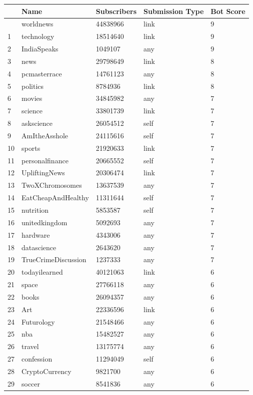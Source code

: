 \documentclass[
  12pt,
  letterpaper,
  DIV=11,
  numbers=noendperiod]{scrartcl}
\begin{document}
\begin{longtable}[]{@{}lllll@{}}
\toprule\noalign{}
& Name & Subscribers & Submission Type & Bot Score \\
\midrule\noalign{}
\endhead
\bottomrule\noalign{}
\endlastfoot
0 & worldnews & 44838966 & link & 9 \\
1 & technology & 18514640 & link & 9 \\
2 & IndiaSpeaks & 1049107 & any & 9 \\
3 & news & 29798649 & link & 8 \\
4 & pcmasterrace & 14761123 & any & 8 \\
5 & politics & 8784936 & link & 8 \\
6 & movies & 34845982 & any & 7 \\
7 & science & 33801739 & link & 7 \\
8 & askscience & 26054512 & self & 7 \\
9 & AmItheAsshole & 24115616 & self & 7 \\
10 & sports & 21920633 & link & 7 \\
11 & personalfinance & 20665552 & self & 7 \\
12 & UpliftingNews & 20306474 & link & 7 \\
13 & TwoXChromosomes & 13637539 & any & 7 \\
14 & EatCheapAndHealthy & 11311644 & self & 7 \\
15 & nutrition & 5853587 & self & 7 \\
16 & unitedkingdom & 5092693 & any & 7 \\
17 & hardware & 4343006 & any & 7 \\
18 & datascience & 2643620 & any & 7 \\
19 & TrueCrimeDiscussion & 1237333 & any & 7 \\
20 & todayilearned & 40121063 & link & 6 \\
21 & space & 27766118 & any & 6 \\
22 & books & 26094357 & any & 6 \\
23 & Art & 22336596 & link & 6 \\
24 & Futurology & 21548466 & any & 6 \\
25 & nba & 15482527 & any & 6 \\
26 & travel & 13175774 & any & 6 \\
27 & confession & 11294049 & self & 6 \\
28 & CryptoCurrency & 9821700 & any & 6 \\
29 & soccer & 8541836 & any & 6 \\

\end{longtable}
\end{document}
